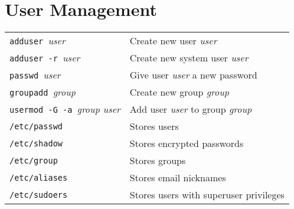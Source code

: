 \section{User Management}
\begin{tabular}{@{}p{\the\MyLen}%
				@{}p{\linewidth-\the\MyLen}}
	\verb!adduser !\textit{user}					& Create new user \textit{user}\\
	\verb!adduser -r !\textit{user}					& Create new system user \textit{user}\\
	\verb!passwd !\textit{user}						& Give user \textit{user} a new password\\
	\verb!groupadd !\textit{group}					& Create new group \textit{group}\\
	\verb!usermod -G -a !\textit{group user}		& Add user \textit{user} to group \textit{group}\\
	\verb!/etc/passwd!								& Stores users\\
	\verb!/etc/shadow!								& Stores encrypted passwords\\
	\verb!/etc/group!								& Stores groups\\
	\verb!/etc/aliases!								& Stores email nicknames\\
	\verb!/etc/sudoers!								& Stores users with superuser privileges\\
\end{tabular}